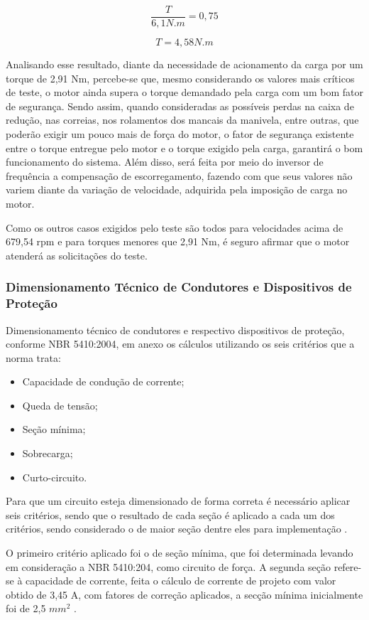 	$$ \frac{T}{6,1 N.m} = 0,75 $$

	$$ T = 4,58 N.m $$

	Analisando esse resultado, diante da necessidade de acionamento da carga por um torque de 2,91 Nm, percebe-se que, mesmo considerando os valores mais críticos de teste, o motor ainda supera o torque demandado pela carga com um bom fator de segurança. Sendo assim, quando consideradas as possíveis perdas na caixa de redução, nas correias, nos rolamentos dos mancais da manivela, entre outras, que poderão exigir um pouco mais de força do motor, o fator de segurança existente entre o torque entregue pelo motor e o torque exigido pela carga, garantirá o bom funcionamento do sistema. Além disso, será feita por meio do inversor de frequência a compensação de escorregamento, fazendo com que seus valores não variem diante da variação de velocidade, adquirida pela imposição de carga no motor.

	Como os outros casos exigidos pelo teste são todos para velocidades acima de 679,54 rpm e para torques menores que 2,91 Nm, é seguro afirmar que o motor atenderá as solicitações do teste.


\subsubsection{Dimensionamento Técnico de Condutores e Dispositivos de Proteção}
	
	Dimensionamento técnico de condutores e respectivo dispositivos de proteção, conforme NBR 5410:2004, em anexo os cálculos utilizando os seis critérios que a norma trata:

	\begin{itemize}
		\item Capacidade de condução de corrente;
		\item Queda de tensão;
		\item Seção mínima;
		\item Sobrecarga;
		\item Curto-circuito.
	\end{itemize}

	Para que um circuito esteja dimensionado de forma correta é necessário aplicar seis critérios, sendo que o resultado de cada seção é aplicado a cada um dos critérios, sendo considerado o de maior seção dentre eles para implementação \cite{NBR5410}.
	
	O primeiro critério aplicado foi o de seção mínima, que foi determinada levando em consideração a NBR 5410:204, como circuito de força. A segunda seção refere-se à capacidade de corrente, feita o cálculo de corrente de projeto com valor obtido de 3,45 A, com fatores de correção aplicados, a secção mínima inicialmente foi de 2,5 $mm^{2}$ \cite{NBR5410}.
	
